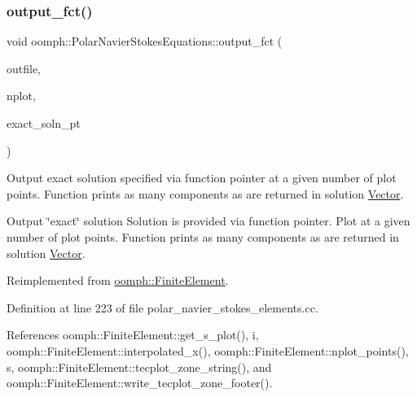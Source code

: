 \mbox{\label{classoomph_1_1PolarNavierStokesEquations_a72787983b9bcc07aafb46d5f7a2e592d}} 
\subsubsection{\texorpdfstring{output\+\_\+fct()}{output\_fct()}\hspace{0.1cm}{\footnotesize\ttfamily [1/2]}}
{\footnotesize\ttfamily void oomph\+::\+Polar\+Navier\+Stokes\+Equations\+::output\+\_\+fct (\begin{DoxyParamCaption}\item[{std\+::ostream \&}]{outfile,  }\item[{const unsigned \&}]{nplot,  }\item[{\hyperlink{classoomph_1_1FiniteElement_a690fd33af26cc3e84f39bba6d5a85202}{Finite\+Element\+::\+Steady\+Exact\+Solution\+Fct\+Pt}}]{exact\+\_\+soln\+\_\+pt }\end{DoxyParamCaption})\hspace{0.3cm}{\ttfamily [virtual]}}



Output exact solution specified via function pointer at a given number of plot points. Function prints as many components as are returned in solution \hyperlink{classoomph_1_1Vector}{Vector}. 

Output \char`\"{}exact\char`\"{} solution Solution is provided via function pointer. Plot at a given number of plot points. Function prints as many components as are returned in solution \hyperlink{classoomph_1_1Vector}{Vector}. 

Reimplemented from \hyperlink{classoomph_1_1FiniteElement_a22b695c714f60ee6cd145be348042035}{oomph\+::\+Finite\+Element}.



Definition at line 223 of file polar\+\_\+navier\+\_\+stokes\+\_\+elements.\+cc.



References oomph\+::\+Finite\+Element\+::get\+\_\+s\+\_\+plot(), i, oomph\+::\+Finite\+Element\+::interpolated\+\_\+x(), oomph\+::\+Finite\+Element\+::nplot\+\_\+points(), s, oomph\+::\+Finite\+Element\+::tecplot\+\_\+zone\+\_\+string(), and oomph\+::\+Finite\+Element\+::write\+\_\+tecplot\+\_\+zone\+\_\+footer().



